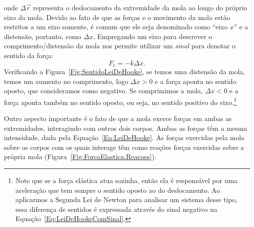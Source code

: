 \noindent{}onde $\Delta\vec{r}$ representa o deslocamento da extremidade da mola ao longo do próprio eixo da mola. Devido ao fato de que as forças e o movimento da mola estão restritos a um eixo somente, é comum que ele seja denominado como ``eixo $x$'' e a distensão, portanto, como $\Delta x$. Empregando um eixo para descrever o comprimento/distensão da mola nos permite utilizar um \emph{sinal} para denotar o sentido da força:
\begin{equation}\label{Eq:LeiDeHookeComSinal}
    F_e = - k\Delta x.
\end{equation} 
%
Verificando a Figura~\eqref{Fig:SentidoLeiDeHooke}, se temos uma distensão da mola, temos um aumento no comprimento, logo $\Delta x > 0$ e a força aponta no sentido oposto, que consideramos como negativo. Se comprimimos a mola, $\Delta x < 0$ e a força aponta também no sentido oposto, ou seja, no sentido positivo do eixo.\footnote{Note que se a força elástica atua sozinha, então ela é responsável por uma aceleração que tem sempre o sentido oposto ao do deslocamento. Ao aplicarmos a Segunda Lei de Newton para analisar um sistema desse tipo, essa diferença de sentidos é expressada através do sinal negativo na Equação~\eqref{Eq:LeiDeHookeComSinal}.}

Outro aspecto importante é o fato de que a mola exerce forças em ambas as extremidades, interagindo com outros dois corpos. Ambas as forças têm a mesma intensidade, dada pela Equação~\eqref{Eq:LeiDeHooke}. As forças exercidas pela mola sobre os corpos com os quais interage têm como reações forças exercidas sobre a própria mola (Figura~\ref{Fig:ForcaElastica:Reacoes}).

